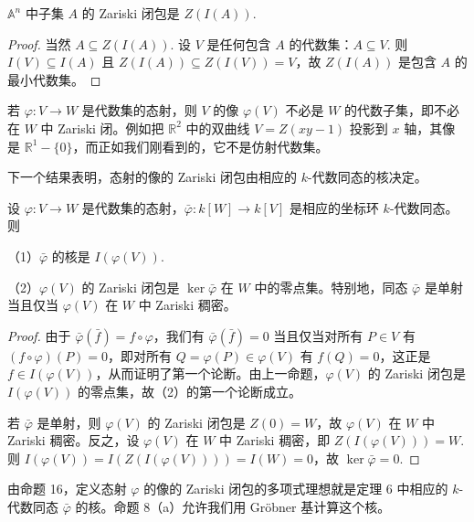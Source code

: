 \begin{proposition}\label{pro:15.15}
\(\mathbb{A}^n\) 中子集 \(A\) 的 Zariski 闭包是 \(Z(I(A))\).
\end{proposition}

\begin{proof}
当然 \(A \subseteq Z(I(A))\). 设 \(V\) 是任何包含 \(A\) 的代数集：\(A \subseteq V\). 则 \(I(V) \subseteq I(A)\) 且 \(Z(I(A)) \subseteq Z(I(V)) = V\)，故 \(Z(I(A))\) 是包含 \(A\) 的最小代数集。
\end{proof}

若 \(\varphi : V \to W\) 是代数集的态射，则 \(V\) 的像 \(\varphi(V)\) 不必是 \(W\) 的代数子集，即不必在 \(W\) 中 Zariski 闭。例如把 \(\mathbb{R}^2\) 中的双曲线 \(V = Z(xy-1)\) 投影到 \(x\) 轴，其像是 \(\mathbb{R}^1-\{0\}\)，而正如我们刚看到的，它不是仿射代数集。

下一个结果表明，态射的像的 Zariski 闭包由相应的 \(k\)-代数同态的核决定。

\begin{proposition}\label{pro:15.16}
设 \(\varphi : V \to W\) 是代数集的态射，\(\bar\varphi : k[W] \to k[V]\) 是相应的坐标环 \(k\)-代数同态。则

（1）\(\bar\varphi\) 的核是 \(I(\varphi(V))\).

（2）\(\varphi(V)\) 的 Zariski 闭包是 \(\ker\bar\varphi\) 在 \(W\) 中的零点集。特别地，同态 \(\bar\varphi\) 是单射当且仅当 \(\varphi(V)\) 在 \(W\) 中 Zariski 稠密。
\end{proposition}

\begin{proof}
由于 \(\bar\varphi(\bar f) = f\circ\varphi\)，我们有 \(\bar\varphi(\bar f) = 0\) 当且仅当对所有 \(P \in V\) 有 \((f\circ\varphi)(P) = 0\)，即对所有 \(Q = \varphi(P) \in \varphi(V)\) 有 \(f(Q) = 0\)，这正是 \(f \in I(\varphi(V))\)，从而证明了第一个论断。由上一命题，\(\varphi(V)\) 的 Zariski 闭包是 \(I(\varphi(V))\) 的零点集，故（2）的第一个论断成立。

若 \(\bar\varphi\) 是单射，则 \(\varphi(V)\) 的 Zariski 闭包是 \(Z(0) = W\)，故 \(\varphi(V)\) 在 \(W\) 中 Zariski 稠密。反之，设 \(\varphi(V)\) 在 \(W\) 中 Zariski 稠密，即 \(Z(I(\varphi(V))) = W\). 则 \(I(\varphi(V)) = I(Z(I(\varphi(V)))) = I(W) = 0\)，故 \(\ker\bar\varphi = 0\).
\end{proof}

由命题 16，定义态射 \(\varphi\) 的像的 Zariski 闭包的多项式理想就是定理 6 中相应的 \(k\)-代数同态 \(\bar\varphi\) 的核。命题 8（a）允许我们用 Gröbner 基计算这个核。

